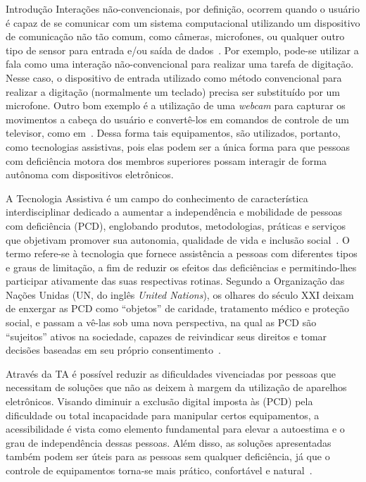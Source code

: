 \begin{chapter}{Introdução}
Interações não-convencionais, por definição, ocorrem quando o usuário é capaz de
se comunicar com um sistema computacional utilizando um dispositivo de
comunicação não tão comum, como câmeras, microfones, ou qualquer outro tipo de
sensor para entrada e/ou saída de dados~\cite{Machado10}. Por exemplo, pode-se
utilizar a fala como uma interação não-convencional para realizar uma tarefa de
digitação. Nesse caso, o dispositivo de entrada utilizado como método
convencional para realizar a digitação (normalmente um teclado) precisa ser
substituído por um microfone. Outro bom exemplo é a utilização de uma
\textit{webcam} para capturar os movimentos a cabeça do usuário e convertê-los
em comandos de controle de um televisor, como em~\cite{Batista17}. Dessa forma
tais equipamentos, são utilizados, portanto, como tecnologias assistivas, pois
elas podem ser a única forma para que pessoas com deficiência motora dos
membros superiores possam interagir de forma autônoma com dispositivos
eletrônicos. %
 
A Tecnologia Assistiva é um campo do conhecimento de característica
interdisciplinar dedicado a aumentar a independência e mobilidade de pessoas
com deficiência (PCD), englobando produtos, metodologias, práticas e serviços
que objetivam promover sua autonomia, qualidade de vida e inclusão
social~\cite{cat09}. O termo refere-se à tecnologia que fornece
assistência a pessoas com diferentes tipos e graus de limitação, a fim de
reduzir os efeitos das deficiências e permitindo-lhes participar ativamente das
suas respectivas rotinas. Segundo a Organização das Nações Unidas (UN, do inglês
\textit{United Nations}), os olhares do século XXI deixam de enxergar as PCD
como ``objetos'' de caridade, tratamento médico e proteção social, e passam a
vê-las sob uma nova perspectiva, na qual as PCD são ``sujeitos'' ativos na
sociedade, capazes de reivindicar seus direitos e tomar decisões baseadas em seu
próprio consentimento~\cite{UN07}. %

Através da TA é possível reduzir as dificuldades vivenciadas por pessoas que
necessitam de soluções que não as deixem à margem da utilização de aparelhos
eletrônicos. Visando diminuir a exclusão digital imposta às (PCD) pela
dificuldade ou total incapacidade para manipular certos equipamentos, a
acessibilidade é vista como elemento fundamental para elevar a autoestima e o
grau de independência dessas pessoas. Além disso, as soluções apresentadas
também podem ser úteis para as pessoas sem qualquer deficiência, já que o
controle de equipamentos torna-se mais prático, confortável e
natural~\cite{Wechsung09}. %


\end{chapter}
